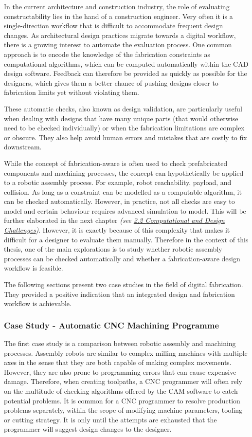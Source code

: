 In the current architecture and construction industry, the role of evaluating constructability lies in the hand of a construction engineer. Very often it is a single-direction workflow that is difficult to accommodate frequent design changes. As architectural design practices migrate towards a digital workflow, there is a growing interest to automate the evaluation process. One common approach is to encode the knowledge of the fabrication constraints as computational algorithms, which can be computed automatically within the CAD design software. Feedback can therefore be provided as quickly as possible for the designers, which gives them a better chance of pushing designs closer to fabrication limits yet without violating them. 

These automatic checks, also known as design validation, are particularly useful when dealing with designs that have many unique parts (that would otherwise need to be checked individually) or when the fabrication limitations are complex or obscure. They also help avoid human errors and mistakes that are costly to fix downstream. 

While the concept of fabrication-aware is often used to check prefabricated components and machining processes, the concept can hypothetically be applied to a robotic assembly process. For example, robot reachability, payload, and collision. As long as a constraint can be modelled as a computable algorithm, it can be checked automatically. However, in practice, not all checks are easy to model and certain behaviour requires advanced simulation to model. This will be further elaborated in the next chapter \textit{(see \ul{2.2 Computational and Design Challenges})}. However, it is exactly because of this complexity that makes it difficult for a designer to evaluate them manually. Therefore in the context of this thesis, one of the main explorations is to study whether robotic assembly processes can be checked automatically and whether a fabrication-aware design workflow is feasible. 

The following sections present two case studies in the field of digital fabrication. They provided a positive indication that an integrated design and fabrication workflow is achievable.

\subsubsection{Case Study - Automatic CNC Machining Programme}

The first case study is a comparison between robotic assembly and machining processes. Assembly robots are similar to complex milling machines with multiple axes in the sense that they are both capable of making complex movements. However, they are also prone to programming errors that can cause expensive damage. Therefore, when creating toolpaths, a CNC programmer will often rely on the multitude of checking algorithms offered by the CAM software to catch potential problems. It is common for a CNC programmer to resolve production problems separately, within the scope of modifying machine parameters, tooling or cutting strategy. It is only until the attempts are exhausted that the programmer will suggest design changes to the designer. 

